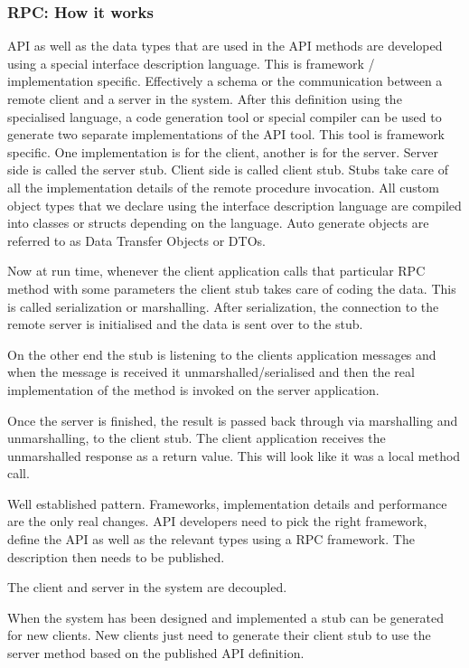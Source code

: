 \subsubsection{RPC: How it works}
API as well as the data types that are used in the API methods are developed using a special interface description language.
This is framework / implementation specific.
Effectively a schema or the communication between a remote client and a server in the system.
After this definition using the specialised language, a code generation tool or special compiler can be used to generate two separate implementations of the API tool.
This tool is framework specific.
One implementation is for the client, another is for the server.
Server side is called the server stub.
Client side is called client stub.
Stubs take care of all the implementation details of the remote procedure invocation.
All custom object types that we declare using the interface description language are compiled into classes or structs depending on the language.
Auto generate objects are referred to as Data Transfer Objects or DTOs.

Now at run time, whenever the client application calls that particular RPC method with some parameters the client stub takes care of coding the data.
This is called serialization or marshalling.
After serialization, the connection to the remote server is initialised and the data is sent over to the stub.

On the other end the stub is listening to the clients application messages and when the message is received it
unmarshalled/serialised and then the real implementation of the method is invoked on the server application.

Once the server is finished, the result is passed back through via marshalling and unmarshalling, to the client stub.
The client application receives the unmarshalled response as a return value.
This will look like it was a local method call.

Well established pattern.
Frameworks, implementation details and performance are the only real changes.
API developers need to pick the right framework, define the API as well as the relevant types using a RPC framework.
The description then needs to be published.

The client and server in the system are decoupled.

When the system has been designed and implemented a stub can be generated for new clients.
New clients just need to generate their client stub to use the server method based on the published API definition.

